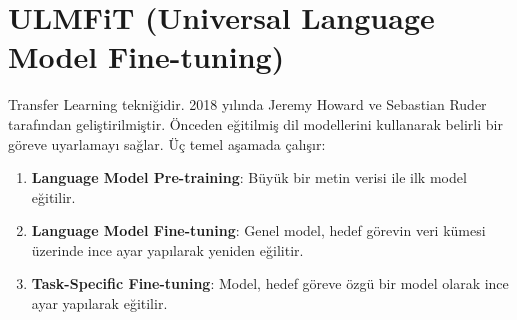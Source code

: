 \section{ULMFiT (Universal Language Model Fine-tuning)}
Transfer Learning tekniğidir. 2018 yılında Jeremy Howard ve Sebastian Ruder tarafından geliştirilmiştir. Önceden eğitilmiş dil modellerini kullanarak belirli bir göreve uyarlamayı sağlar.  Üç temel aşamada çalışır:

\begin{enumerate}
	\item \textbf{Language Model Pre-training}: Büyük bir metin verisi ile ilk model eğitilir.
	\item \textbf{Language Model Fine-tuning}: Genel model, hedef görevin veri kümesi üzerinde ince ayar yapılarak yeniden eğilitir. 
	\item \textbf{Task-Specific Fine-tuning}: Model, hedef göreve özgü bir model olarak ince ayar yapılarak eğitilir.
\end{enumerate}



\newpage
